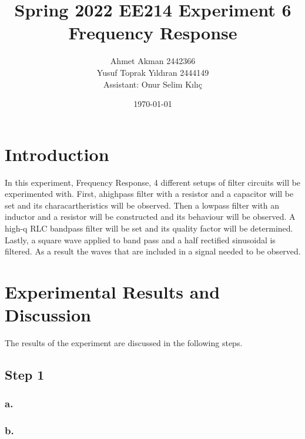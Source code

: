 \documentclass[letterpaper,12pt]{article}
\begin{document}
\thispagestyle{empty}

\title{Spring 2022 EE214 Experiment 6  \protect\\ Frequency Response}
\author{Ahmet Akman 2442366 \protect\\ Yusuf Toprak Yıldıran 2444149 \protect\\ Assistant: Onur Selim Kılıç}
\date{\today}
\maketitle
\tableofcontents
\section{Introduction}
In this experiment, Frequency Response, 4 different setups of filter circuits will be experimented with. First, ahighpass filter with a resistor and a capacitor will be set and its characartheristics will be observed. Then a lowpass filter with an inductor and a resistor will be constructed and its behaviour will be observed. A high-q RLC bandpass filter will be set and its quality factor will be determined. Lastly, a square wave applied to band pass and a half rectified sinusoidal is filtered. As a result the waves that are included in a signal needed to be observed.
\section{Experimental Results and Discussion}
The results of the experiment are discussed in the following steps.
%
\subsection{Step 1}
\subsubsection{a.}

\subsubsection{b.}
\end{document}
